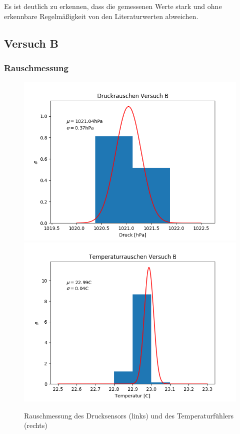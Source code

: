 \documentclass[12pt,a4paper]{article}
\begin{document}
Es ist deutlich zu erkennen, dass die gemessenen Werte stark und ohne erkennbare Regelmäßigkeit von den Literaturwerten abweichen. 


\subsection{Versuch B}


\subsubsection{Rauschmessung}

\begin{figure}
\includegraphics[scale=0.5]{Bilder/DruckrauschenB}
\includegraphics[scale=0.5]{Bilder/TemprauschenB}
\caption[Rauschmessung Versuch B]{Rauschmessung des Drucksensors (links) und des Temperaturfühlers (rechts)}
\label{fig:RauschenB}
\end{figure}
\end{document}
